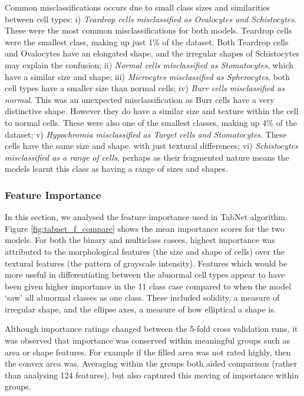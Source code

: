 \documentclass[final,5p,times,twocolumn,authoryear]{elsarticle}
\begin{document}
{Common misclassifications} occurs due to small class sizes and similarities between cell types:
     i) \textit{Teardrop cells misclassified as Ovalocytes and Schistocytes}. These were the most common misclassifications for both models. Teardrop cells were the smallest class, making up just 1\% of the dataset. Both Teardrop cells and Ovalocytes have an elongated shape, and the irregular shapes of Schistocytes may explain the confusion;
    ii) \textit{Normal cells misclassified as Stomatocytes}, which have a similar size and shape;
    iii) \textit{Microcytes misclassified as Spherocytes}, both cell types have a smaller size than normal cells;
    iv) \textit{Burr cells misclassified as normal}. This was an unexpected misclassification as Burr cells have a very distinctive shape. However they do have a similar size and texture within the cell to normal cells. These were also one of the smallest classes, making up 4\% of the dataset;
    v) \textit{Hypochromia misclassified as Target cells and Stomatocytes}. These cells have the same size and shape.  with just textural differences;
    vi) \textit{Schistocytes misclassified as a range of cells}, perhaps as their fragmented nature means the models learnt this class as having a range of sizes and shapes.

\subsubsection{Feature Importance}
\label{subsec:tab_importance}

In this section, we analysed the feature importance used in TabNet algorithm.
Figure \ref{fig:tabnet_f_compare} shows the mean importance scores for the two models. For both the binary and multiclass casees, highest importance was attributed to the morphological features (the size and shape of cells) over the textural features (the pattern of grayscale intensity). Features which would be more useful in differentiating between the abnormal cell types appear to have been given higher importance in the 11 class case compared to when the model `saw' all abnormal classes as one class. These included solidity, a measure of irregular shape, and the ellipse axes, a measure of how elliptical a shape is.

Although importance ratings changed between the 5-fold cross validation runs, it was observed that importance was conserved within meaningful groups such as area or shape features. For example if the filled area was not rated highly, then the convex area was. Averaging within the groups both aided comparison (rather than analysing 124 features), but also captured this moving of importance within groups.
\end{document}
